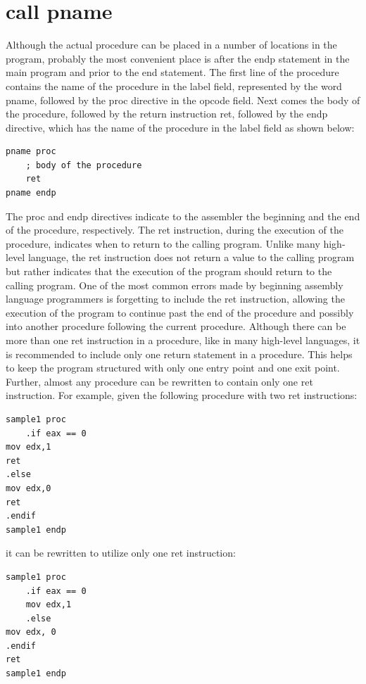 \documentclass[10pt]{book}
\begin{document}
\section*{call pname}
Although the actual procedure can be placed in a number of locations in the program, probably the most convenient place is after the endp statement in the main program and prior to the end statement. The first line of the procedure contains the name of the procedure in the label field, represented by the word pname, followed by the proc directive in the opcode field. Next comes the body of the procedure, followed by the return instruction ret, followed by the endp directive, which has the name of the procedure in the label field as shown below:

\begin{verbatim}
pname proc
    ; body of the procedure
    ret
pname endp
\end{verbatim}

The proc and endp directives indicate to the assembler the beginning and the end of the procedure, respectively. The ret instruction, during the execution of the procedure, indicates when to return to the calling program. Unlike many high-level language, the ret instruction does not return a value to the calling program but rather indicates that the execution of the program should return to the calling program. One of the most common errors made by beginning assembly language programmers is forgetting to include the ret instruction, allowing the execution of the program to continue past the end of the procedure and possibly into another procedure following the current procedure. Although there can be more than one ret instruction in a procedure, like in many high-level languages, it is recommended to include only one return statement in a procedure. This helps to keep the program structured with only one entry point and one exit point. Further, almost any procedure can be rewritten to contain only one ret instruction. For example, given the following procedure with two ret instructions:

\begin{verbatim}
sample1 proc
    .if eax == 0
mov edx,1
ret
.else
mov edx,0
ret
.endif
sample1 endp
\end{verbatim}

it can be rewritten to utilize only one ret instruction:

\begin{verbatim}
sample1 proc
    .if eax == 0
    mov edx,1
    .else
mov edx, 0
.endif
ret
sample1 endp
\end{verbatim}
\end{document}
